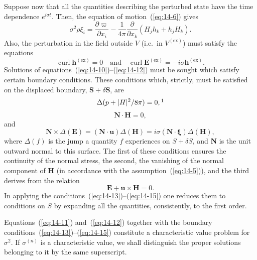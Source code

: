 Suppose now that all the quantities describing the perturbed state have the time dependence $e^{i\sigma t}$. Then, the equation of motion~(\ref{eq:14-6}) gives
\begin{equation}
\label{eq:14-11}
\sigma^2 \rho \xi_i = \frac{\partial \varpi}{\partial x_i} - \frac{1}{4\pi} \frac{\partial}{\partial x_k} (H_j h_k + h_j H_k).
\end{equation}
Also, the perturbation in the field outside $V$ (i.e.\ in $V^{(\mathrm{ex})}$) must satisfy the equations
\begin{equation}
\label{eq:14-12}
\operatorname{curl} \mathbf{h}^{(\mathrm{ex})} = 0 \quad \text{and} \quad \operatorname{curl} \mathbf{E}^{(\mathrm{ex})} = -i\sigma \mathbf{h}^{(\mathrm{ex})}.
\end{equation}
Solutions of equations~(\ref{eq:14-10})--(\ref{eq:14-12}) must be sought which satisfy certain boundary conditions. These conditions which, strictly, must be satisfied on the displaced boundary, $\mathbf{S} + \delta \mathbf{S}$, are
\begin{equation}
\label{eq:14-13}
\Delta(p + |\mathbf{H}|^2/8\pi) = 0,\footnotemark
\end{equation}
\begin{equation}
\label{eq:14-14}
\mathbf{N} \cdot \mathbf{H} = 0,
\end{equation}
and
\begin{equation}
\label{eq:14-15}
\mathbf{N} \times \Delta(\mathbf{E}) = (\mathbf{N} \cdot \mathbf{u}) \Delta(\mathbf{H}) = i\sigma (\mathbf{N} \cdot \boldsymbol{\xi}) \Delta(\mathbf{H}),
\end{equation}
where $\Delta(f)$ is the jump a quantity $f$ experiences on $S + \delta S$, and $\mathbf{N}$ is the unit outward normal to this surface. The first of these conditions ensures the continuity of the normal stress, the second, the vanishing of the normal component of $\mathbf{H}$ (in accordance with the assumption~(\ref{eq:14-5})), and the third derives from the relation
\begin{equation}
\label{eq:14-16}
\mathbf{E} + \mathbf{u} \times \mathbf{H} = 0.
\end{equation}
In applying the conditions~(\ref{eq:14-13})--(\ref{eq:14-15}) one reduces them to conditions on $S$ by expanding all the quantities, consistently, to the first order.

Equations~(\ref{eq:14-11}) and~(\ref{eq:14-12}) together with the boundary conditions~(\ref{eq:14-13})--(\ref{eq:14-15}) constitute a characteristic value problem for $\sigma^2$. If $\sigma^{(n)}$ is a characteristic value, we shall distinguish the proper solutions belonging to it by the same superscript.

